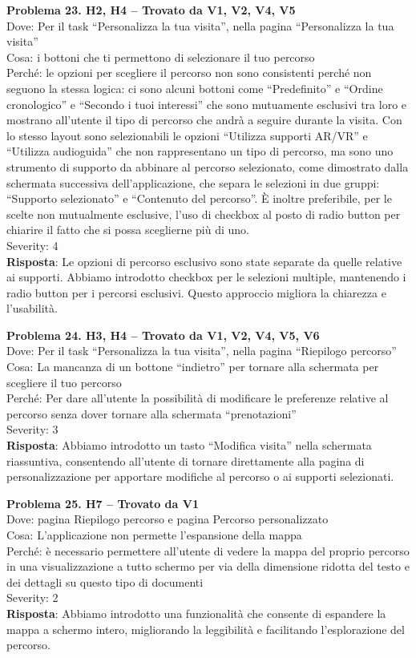 \documentclass{article}
\begin{document}
\noindent \textbf{Problema 23. H2, H4 – Trovato da V1, V2, V4, V5} \\
Dove: Per il task “Personalizza la tua visita”, nella pagina “Personalizza la tua visita” \\
Cosa: i bottoni che ti permettono di selezionare il tuo percorso \\
Perché: le opzioni per scegliere il percorso non sono consistenti perché non seguono la stessa logica: ci sono alcuni bottoni come “Predefinito” e “Ordine cronologico” e “Secondo i tuoi interessi” che sono mutuamente esclusivi tra loro e mostrano all’utente il tipo di percorso che andrà a seguire durante la visita. Con lo stesso layout sono selezionabili le opzioni “Utilizza supporti AR/VR” e “Utilizza audioguida” che non rappresentano un tipo di percorso, ma sono uno strumento di supporto da abbinare al percorso selezionato, come dimostrato dalla schermata successiva dell’applicazione, che separa le selezioni in due gruppi: “Supporto selezionato” e “Contenuto del percorso”. È inoltre preferibile, per le scelte non mutualmente esclusive, l’uso di checkbox al posto di radio button per chiarire il fatto che si possa sceglierne più di uno. \\
Severity: 4 \\
\textbf{Risposta}: Le opzioni di percorso esclusivo sono state separate da quelle relative ai supporti. Abbiamo introdotto checkbox per le selezioni multiple, mantenendo i radio button per i percorsi esclusivi. Questo approccio migliora la chiarezza e l’usabilità.

\noindent \textbf{Problema 24. H3, H4 – Trovato da V1, V2, V4, V5, V6} \\
Dove: Per il task “Personalizza la tua visita”, nella pagina “Riepilogo percorso” \\
Cosa: La mancanza di un bottone “indietro” per tornare alla schermata per scegliere il tuo percorso \\
Perché: Per dare all’utente la possibilità di modificare le preferenze relative al percorso senza dover tornare alla schermata “prenotazioni” \\
Severity: 3 \\
\textbf{Risposta}: Abbiamo introdotto un tasto “Modifica visita” nella schermata riassuntiva, consentendo all’utente di tornare direttamente alla pagina di personalizzazione per apportare modifiche al percorso o ai supporti selezionati.

\noindent \textbf{Problema 25. H7 – Trovato da V1} \\
Dove: pagina Riepilogo percorso e pagina Percorso personalizzato \\
Cosa: L’applicazione non permette l’espansione della mappa \\
Perché: è necessario permettere all’utente di vedere la mappa del proprio percorso in una visualizzazione a tutto schermo per via della dimensione ridotta del testo e dei dettagli su questo tipo di documenti \\
Severity: 2 \\
\textbf{Risposta}: Abbiamo introdotto una funzionalità che consente di espandere la mappa a schermo intero, migliorando la leggibilità e facilitando l’esplorazione del percorso.
\end{document}

